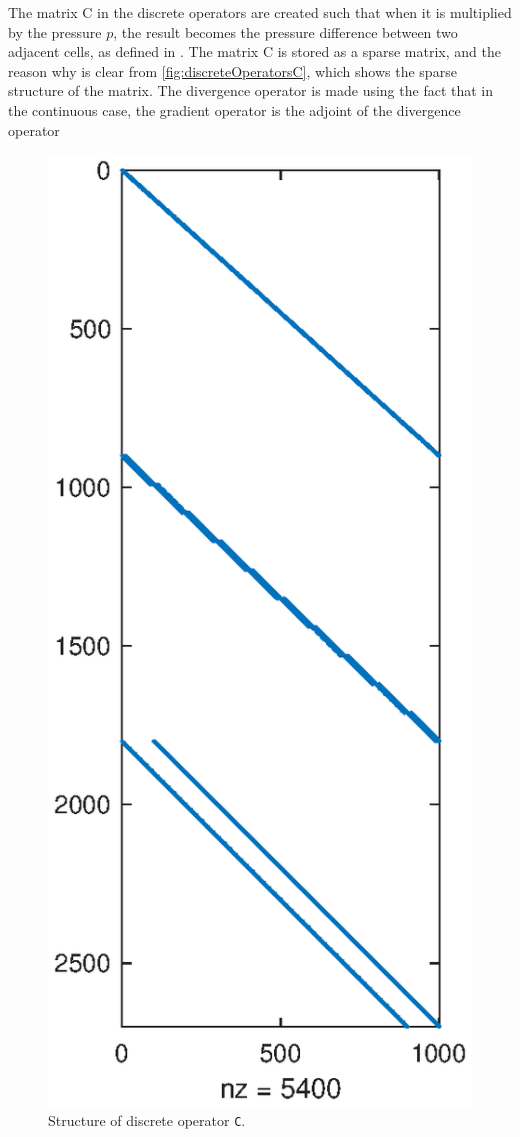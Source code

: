 The matrix C in the discrete operators are created such that when it is multiplied by the pressure $p$, the result becomes the pressure difference between two adjacent cells, as defined in . The matrix C is stored as a sparse matrix, and the reason why is clear from \autoref{fig:discreteOperatorsC}, which shows the sparse  structure of the matrix. The divergence operator is made using the fact that in the continuous case, the gradient operator is the adjoint of the divergence operator
\begin{figure}
    \includegraphics[width=\linewidth]{figures/flowSolver_discrete_operators_C.eps}
    \caption{Structure of discrete operator \texttt{C}.}
    \label{fig:discreteOperatorsC}
\end{figure}
